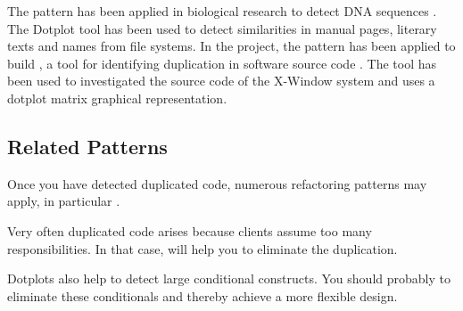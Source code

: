 \documentclass[a4paper,10pt,twoside]{book}
\begin{document}
The pattern has been applied in biological research to detect DNA sequences \cite{Pust82a}. The Dotplot tool \cite{Helf95a} has been used to detect similarities in manual pages, literary texts and names from file systems. In the  project, the pattern has been applied to build , a tool for identifying duplication in software source code \cite{Duca99b}. The  tool \cite{Bake92a} has been used to investigated the source code of the X-Window system and uses a dotplot matrix graphical representation.

\subsection*{Related Patterns}

Once you have detected duplicated code, numerous refactoring patterns may apply, in particular .

Very often duplicated code arises because clients assume too many responsibilities. In that case,  will help you to eliminate the duplication.

Dotplots also help to detect large conditional constructs. You should probably  to eliminate these conditionals and thereby achieve a more flexible design. 

\ifx\wholebook\relax\else
   
   
   
\end{document}
